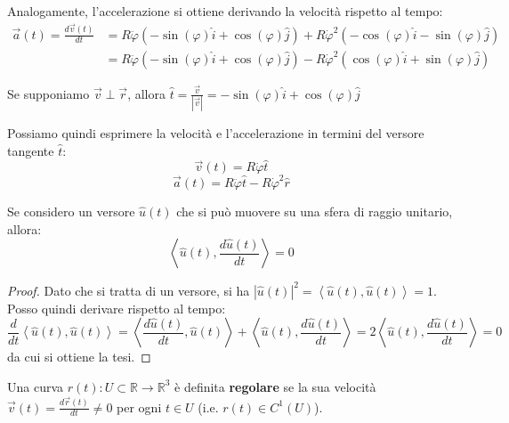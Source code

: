 \begin{example}
    Analogamente, l'accelerazione si ottiene derivando la velocità rispetto al tempo:
    \begin{align*}
        \vec a(t) = \frac{d \vec v(t)}{dt} &= R\ddot{\varphi}(-\sin(\varphi)\hat i + \cos(\varphi)\hat j) + R\dot{\varphi}^2(-\cos(\varphi)\hat i - \sin(\varphi)\hat j) \\
        &= R\ddot{\varphi}(-\sin(\varphi)\hat i + \cos(\varphi)\hat j) - R\dot{\varphi}^2(\cos(\varphi)\hat i + \sin(\varphi)\hat j)
    \end{align*}

    Se supponiamo $\vec v \perp \vec r$, allora $\hat t=\frac{\vec{v}}{|\vec{v}|}=-\sin(\varphi)\hat i + \cos(\varphi)\hat j$

    Possiamo quindi esprimere la velocità e l'accelerazione in termini del versore tangente $\hat t$:
    \begin{equation*}
        \vec v(t) = R\dot{\varphi}\hat t
    \end{equation*}
    \begin{equation*}
        \vec a(t) = R\ddot{\varphi}\hat t - R\dot{\varphi}^2 \hat r
    \end{equation*}
\end{example}

\begin{proposition}
    Se considero un versore $\hat u (t)$ che si può muovere su una sfera di raggio unitario, allora:
    \begin{equation*}
        \left< \hat u(t), \frac{d \hat u (t)}{dt} \right> = 0
    \end{equation*}
\end{proposition}

\begin{proof}
    Dato che si tratta di un versore, si ha $|\hat u(t)|^2=\left< \hat u(t), \hat u(t) \right> = 1$.
    Posso quindi derivare rispetto al tempo:
    \begin{equation*}
        \frac{d}{dt} \left< \hat u(t), \hat u(t) \right> = \left< \frac{d \hat u (t)}{dt}, \hat u(t) \right> + \left< \hat u(t), \frac{d \hat u (t)}{dt} \right> = 2\left< \hat u(t), \frac{d \hat u (t)}{dt} \right> = 0
    \end{equation*}
    da cui si ottiene la tesi.
\end{proof}

\begin{definition}
    Una curva $r(t) : U \subset \mathbb{R} \to \mathbb{R}^3$ è definita \textbf{regolare} se la sua velocità $\vec v(t) = \frac{d \vec r(t)}{dt} \neq 0$  per ogni $t \in U$ (i.e. $r(t)\in C^1(U)$). 
\end{definition}

